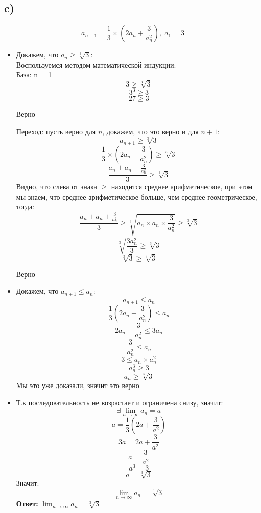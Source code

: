 \documentclass[a4paper,12pt]{article}
\begin{document}
\subsection*{c)}
\[
a_{n+1} = \frac{1}{3} \times (2a_n + \frac{3}{a_n^2}), \; a_1 = 3
\]
\begin{itemize}
\item Докажем, что $a_n \geq \sqrt[3]{3}$:\\
Воспользуемся методом математической индукции:
\\
База: n = 1
\\
\[
3 \geq \sqrt[3]{3}
\]
\[
3^3 \geq 3
\]
\[
27 \geq 3
\]
\begin{center}
Верно
\end{center}
Переход: пусть верно для  $n$,  докажем, что это верно и для $n+1$:
\[
a_{n+1} \geq \sqrt[3]{3}
\]
\[
\frac{1}{3} \times (2a_n + \frac{3}{a_n^2}) \geq \sqrt[3]{3}
\]
\[
\frac{a_n + a_n + \frac{3}{a_n^2} }{3} \geq \sqrt[3]{3}
\]
Видно, что слева от знака $ \geq $ находится среднее арифметическое, при этом мы знаем, что среднее арифметическое больше, чем среднее геометрическое, тогда:
\[
\frac{a_n + a_n + \frac{3}{a_n^2} }{3} \geq \sqrt[3]{a_n \times a_n \times \frac{3}{a_n^2}} \geq \sqrt[3]{3}
\]
\[
\sqrt[3]{\frac{3a_n^2}{3}} \geq \sqrt[3]{3}
\]
\[
\sqrt[3]{3} \geq \sqrt[3]{3}
\]
\begin{center}
Верно
\end{center}
\item Докажем, что $a_{n+1} \leq a_n$:
\[
a_{n+1} \leq a_n
\]
\[
\frac{1}{3}(2a_n + \frac{3}{a_n^2}) \leq a_n
\]
\[
2a_n + \frac{3}{a_n^2} \leq 3a_n
\]
\[
\frac{3}{a_n^2} \leq a_n
\]
\[
3 \leq a_n \times a_n^2
\]
\[
a_n^3 \geq 3
\]
\[
a_n \geq \sqrt[3]{3}
\]
Мы это уже доказали, значит это верно
\\
\item Т.к последовательность не возрастает и ограничена снизу, значит:
\[
\exists \lim_{n \rightarrow \infty} a_n = a
\]
\[
a = \frac{1}{3} (2a + \frac{3}{a^2})
\]
\[
3a = 2a + \frac{3}{a^2}
\]
\[
a = \frac{3}{a^2}
\]
\[
a^3 = 3
\]
\[
a = \sqrt[3]{3}
\]
Значит:
\[
\lim_{n \rightarrow \infty} a_n = \sqrt[3]{3}
\]
\textbf{Ответ:} $\lim_{n \rightarrow \infty} a_n = \sqrt[3]{3}$

\end{itemize}
\end{document}
